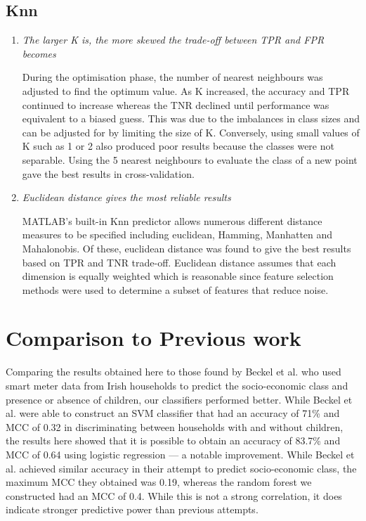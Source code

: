 \subsection{Knn}

\begin{enumerate}

\item \textit{The larger K is, the more skewed the trade-off between TPR and FPR becomes}

During the optimisation phase, the number of nearest neighbours was adjusted to find the optimum value. As K increased, the accuracy and TPR continued to increase whereas the TNR declined until performance was equivalent to a biased guess. This was due to the imbalances in class sizes and can be adjusted for by limiting the size of K. Conversely, using small values of K such as 1 or 2 also produced poor results because the classes were not separable. Using the 5 nearest neighbours to evaluate the class of a new point gave the best results in cross-validation.

\item \textit{Euclidean distance gives the most reliable results}

MATLAB's built-in Knn predictor allows numerous different distance measures to be specified including euclidean, Hamming, Manhatten and Mahalonobis. Of these, euclidean distance was found to give the best results based on TPR and TNR trade-off. Euclidean distance assumes that each dimension is equally weighted which is reasonable since feature selection methods were used to determine a subset of features that reduce noise.
\end{enumerate}


\section{Comparison to Previous work}

Comparing the results obtained here to those found by Beckel et al. \cite{Beckel_1, Beckel_2, Beckel_3} who used smart meter data from Irish households to predict the socio-economic class and presence or absence of children, our classifiers performed better. While Beckel et al. were able to construct an SVM classifier that had an accuracy of 71\% and MCC of 0.32 in discriminating between households with and without children, the results here showed that it is possible to obtain an accuracy of 83.7\% and MCC of 0.64 using logistic regression --- a notable improvement. While Beckel et al. achieved similar accuracy in their attempt to predict socio-economic class, the maximum MCC they obtained was 0.19, whereas the random forest we constructed had an MCC of 0.4. While this is not a strong correlation, it does indicate stronger predictive power than previous attempts.


